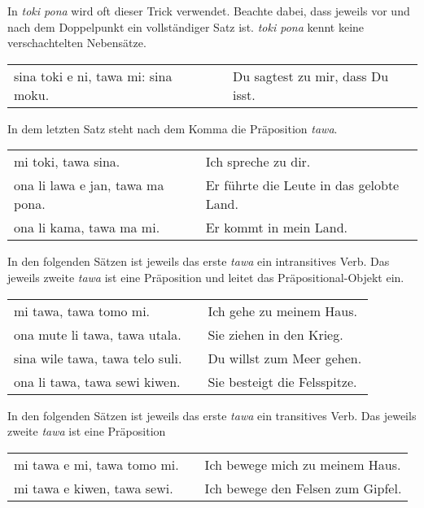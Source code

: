 In \textit{toki pona} wird oft dieser Trick verwendet. 
Beachte dabei, dass jeweils vor und nach dem Doppelpunkt ein vollständiger Satz ist. 
\textit{toki pona} kennt keine verschachtelten Nebensätze.

\begin{supertabular}{p{5,5cm}|ll}
sina toki e ni, tawa mi: sina moku. && Du sagtest zu mir, dass Du isst. \\
\end{supertabular} 

%
In dem letzten Satz steht nach dem Komma die Präposition \textit{tawa}. 

\begin{supertabular}{p{5,5cm}|ll}
mi toki, tawa sina. && Ich spreche zu dir. \\
ona li lawa e jan, tawa ma pona. && Er führte die Leute in das gelobte Land. \\
ona li kama, tawa ma mi. && Er kommt in mein Land. \\
\end{supertabular} 

In den folgenden Sätzen ist jeweils das erste \textit{tawa} ein intransitives Verb.
Das jeweils zweite \textit{tawa} ist eine Präposition und leitet das Präpositional-Objekt ein. 

\begin{supertabular}{p{5,5cm}|ll}
mi tawa, tawa tomo mi. && Ich gehe zu meinem Haus. \\
ona mute li tawa, tawa utala. && Sie ziehen in den Krieg. \\
sina wile tawa, tawa telo suli. && Du willst zum Meer gehen. \\
ona li tawa, tawa sewi kiwen.  && Sie besteigt die Felsspitze. \\
\end{supertabular} 

In den folgenden Sätzen ist jeweils das erste \textit{tawa} ein transitives Verb.
Das jeweils zweite \textit{tawa} ist eine Präposition

\begin{supertabular}{p{5,5cm}|ll}
mi tawa e mi, tawa tomo mi. && Ich bewege mich zu meinem Haus. \\
mi tawa e kiwen, tawa sewi. && Ich bewege den Felsen zum Gipfel. \\
\end{supertabular} 

